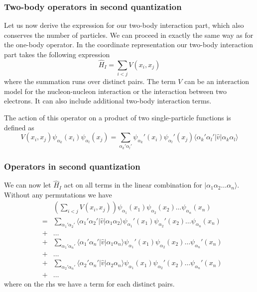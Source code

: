 \documentclass{beamer}
\begin{document}
\begin{frame}
\frametitle{Two-body operators in second quantization}

\begin{block}{}
Let us now derive the expression for our two-body interaction part, which also conserves the number of particles.
We can proceed in exactly the same way as for the one-body operator. In the coordinate representation our
two-body interaction part takes the following expression
\begin{equation}
	\hat{H}_I = \sum_{i < j} V(x_i,x_j) \label{eq:2-31}
\end{equation}
where the summation runs over distinct pairs. The term $V$ can be an interaction model for the nucleon-nucleon interaction
or the interaction between two electrons. It can also include additional two-body interaction terms. 

The action of this operator on a product of 
two single-particle functions is defined as 
\begin{equation}
	V(x_i,x_j) \psi_{\alpha_k}(x_i) \psi_{\alpha_l}(x_j) = \sum_{\alpha_k'\alpha_l'} 
		\psi_{\alpha_k}'(x_i)\psi_{\alpha_l}'(x_j) 
		\langle \alpha_k'\alpha_l'|\hat{v}|\alpha_k\alpha_l\rangle \label{eq:2-32}
\end{equation}
\end{block}
\end{frame}

\begin{frame}
\frametitle{Operators in second quantization}

\begin{block}{}
We can now let $\hat{H}_I$ act on all terms in the linear combination for $|\alpha_1\alpha_2\dots\alpha_n\rangle$. Without any permutations we have
\begin{eqnarray}
	&& \left( \sum_{i < j} V(x_i,x_j) \right) \psi_{\alpha_1}(x_1)\psi_{\alpha_2}(x_2)\dots \psi_{\alpha_n}(x_n) \nonumber \\
	&=& \sum_{\alpha_1'\alpha_2'} \langle \alpha_1'\alpha_2'|\hat{v}|\alpha_1\alpha_2\rangle
		\psi_{\alpha_1}'(x_1)\psi_{\alpha_2}'(x_2)\dots \psi_{\alpha_n}(x_n) \nonumber \\
	& +& \dots \nonumber \\
	&+& \sum_{\alpha_1'\alpha_n'} \langle \alpha_1'\alpha_n'|\hat{v}|\alpha_1\alpha_n\rangle
		\psi_{\alpha_1}'(x_1)\psi_{\alpha_2}(x_2)\dots \psi_{\alpha_n}'(x_n) \nonumber \\
	& +& \dots \nonumber \\
	&+& \sum_{\alpha_2'\alpha_n'} \langle \alpha_2'\alpha_n'|\hat{v}|\alpha_2\alpha_n\rangle
		\psi_{\alpha_1}(x_1)\psi_{\alpha_2}'(x_2)\dots \psi_{\alpha_n}'(x_n) \nonumber \\
	 & +& \dots \label{eq:2-33}
\end{eqnarray}
where on the rhs we have a term for each distinct pairs. 
\end{block}
\end{frame}
\end{document}
